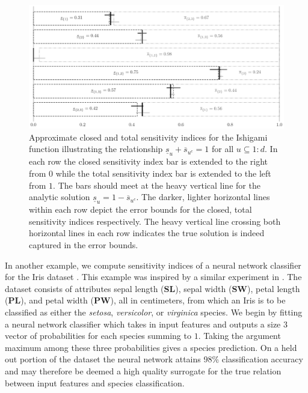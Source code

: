 \documentclass[graybox]{svmult}
\begin{document}
\begin{figure}[t]
    \centering
    \includegraphics[width=.8\textwidth]{figs/ishigami.pdf}
    \caption{Approximate closed and total sensitivity indices for the Ishigami function illustrating the relationship $\underline{s}_u + \overline{s}_{u^c} = 1$ for all $u \subseteq 1:d$. In each row the closed sensitivity index bar is  extended to the right from $0$ while the total sensitivity index bar is extended to the left from $1$. The bars should meet at the heavy vertical line for the analytic solution $\underline{s}_u=1-\overline{s}_{u^c}$. The darker, lighter horizontal lines within each row depict the error bounds for the closed, total sensitivity indices respectively. The heavy vertical line crossing both horizontal lines in each row indicates the true solution is indeed captured in the error bounds.}
    \label{SoRa_fig:ishigami}
\end{figure}

In another example, we compute sensitivity indices of a neural network classifier \cite{he2015delving} for the Iris dataset \cite{uci_ml_repo}. This example was inspired by a similar experiment in \cite{hoyt2021efficient}. The dataset consists of attributes sepal length (\textbf{SL}), sepal width (\textbf{SW}), petal length (\textbf{PL}), and petal width (\textbf{PW}), all in centimeters, from which an Iris is to be classified as either the \emph{setosa}, \emph{versicolor}, or \emph{virginica} species. We begin by fitting a neural network classifier which takes in input features and outputs a size $3$ vector of probabilities for each species summing to $1$. Taking the argument maximum among these three probabilities gives a species prediction. On a held out portion of the dataset the neural network attains 98\% classification accuracy and may therefore be deemed a high quality surrogate for the true relation between input features and species classification. 
\end{document}
